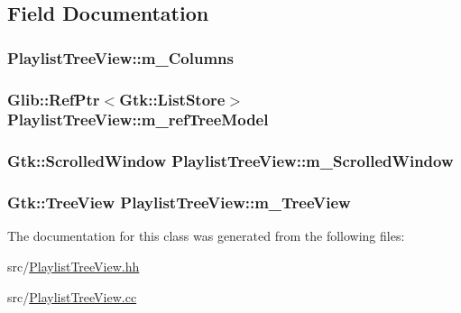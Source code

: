 \subsection{\-Field \-Documentation}
\hypertarget{classPlaylistTreeView_a8e28de0bad495207b343ae862dca7215}{
\subsubsection[{m\-\_\-\-Columns}]{ {\bf \-Playlist\-Tree\-View\-::m\-\_\-\-Columns}}}
\label{classPlaylistTreeView_a8e28de0bad495207b343ae862dca7215}
\hypertarget{classPlaylistTreeView_a8c489fb9e0542fed6a5465a4afc91714}{
\subsubsection[{m\-\_\-ref\-Tree\-Model}]{\setlength{\rightskip}{0pt plus 5cm}\-Glib\-::\-Ref\-Ptr$<$\-Gtk\-::\-List\-Store$>$ {\bf \-Playlist\-Tree\-View\-::m\-\_\-ref\-Tree\-Model}}}
\label{classPlaylistTreeView_a8c489fb9e0542fed6a5465a4afc91714}
\hypertarget{classPlaylistTreeView_ad3b445e2a03227bd5dc93ce4badd5647}{
\subsubsection[{m\-\_\-\-Scrolled\-Window}]{\setlength{\rightskip}{0pt plus 5cm}\-Gtk\-::\-Scrolled\-Window {\bf \-Playlist\-Tree\-View\-::m\-\_\-\-Scrolled\-Window}}}
\label{classPlaylistTreeView_ad3b445e2a03227bd5dc93ce4badd5647}
\hypertarget{classPlaylistTreeView_af386b889e73bc16364f33eb760b08606}{
\subsubsection[{m\-\_\-\-Tree\-View}]{\setlength{\rightskip}{0pt plus 5cm}\-Gtk\-::\-Tree\-View {\bf \-Playlist\-Tree\-View\-::m\-\_\-\-Tree\-View}}}
\label{classPlaylistTreeView_af386b889e73bc16364f33eb760b08606}


\-The documentation for this class was generated from the following files\-:\begin{DoxyCompactItemize}
\item 
src/\hyperlink{PlaylistTreeView_8hh}{\-Playlist\-Tree\-View.\-hh}\item 
src/\hyperlink{PlaylistTreeView_8cc}{\-Playlist\-Tree\-View.\-cc}\end{DoxyCompactItemize}
